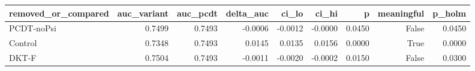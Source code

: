 \begin{tabular}{lrrrrrrrr}
\toprule
removed\_or\_compared & auc\_variant & auc\_pcdt & delta\_auc & ci\_lo & ci\_hi & p & meaningful & p\_holm \\
\midrule
PCDT-noPsi & 0.7499 & 0.7493 & -0.0006 & -0.0012 & -0.0000 & 0.0450 & False & 0.0450 \\
Control & 0.7348 & 0.7493 & 0.0145 & 0.0135 & 0.0156 & 0.0000 & True & 0.0000 \\
DKT-F & 0.7504 & 0.7493 & -0.0011 & -0.0020 & -0.0002 & 0.0150 & False & 0.0300 \\
\bottomrule
\end{tabular}
